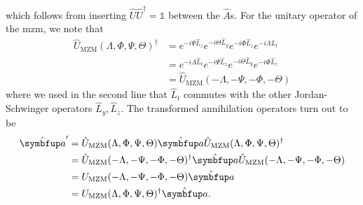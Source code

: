 which follows from inserting $\hat{U}\hat{U}^\dagger=\mathbb{1}$ between the $\hat{A}$s.
For the unitary operator of the \gls{mzm}, we note that
\begin{equation}
	\begin{split}
		\hat{U}_\text{MZM}(\Lambda,\Phi,\Psi,\Theta)^\dagger
		&=
		e^{-i\Psi\hat{L}_z}
		e^{-i\Theta\hat{L}_y}
		e^{-i\Phi\hat{L}_z}
		e^{-i\Lambda\hat{L}_t}
		\\
		&=
		e^{-i\Lambda\hat{L}_t}
		e^{-i\Psi\hat{L}_z}
		e^{-i\Theta\hat{L}_y}
		e^{-i\Phi\hat{L}_z}
		\\
		&=
		\hat{U}_\text{MZM}(-\Lambda,-\Psi,-\Phi,-\Theta)
	\end{split}
\end{equation}
where we used in the second line that $\hat{L}_t$ commutes with the other Jordan-Schwinger operators $\hat{L}_y,\hat{L}_z$.
The transformed annihilation operators turn out to be
\begin{equation}
	\begin{split}
		\hat{\vb{a}}^\prime
		&=
		\hat{U}_\text{MZM}(\Lambda,\Phi,\Psi,\Theta)
		\hat{\vb{a}}
		\hat{U}_\text{MZM}(\Lambda,\Phi,\Psi,\Theta)^\dagger
		\\
		&=
		\hat{U}_\text{MZM}(-\Lambda,-\Psi,-\Phi,-\Theta)^\dagger
		\hat{\vb{a}}
		\hat{U}_\text{MZM}(-\Lambda,-\Psi,-\Phi,-\Theta)
		\\
		&=
		U_\text{MZM}(-\Lambda,-\Psi,-\Phi,-\Theta)
		\hat{\vb{a}}
		\\
		&=
		U_\text{MZM}(\Lambda,\Phi,\Psi,\Theta)^\dagger
		\hat{\vb{a}}
		.
	\end{split}
\end{equation}

